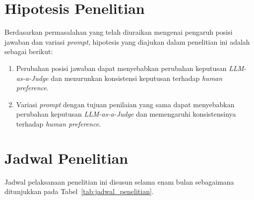 \section{Hipotesis Penelitian}

Berdasarkan permasalahan yang telah diuraikan mengenai pengaruh posisi jawaban dan variasi \textit{prompt}, hipotesis yang diajukan dalam penelitian ini adalah sebagai berikut:
\begin{enumerate}
  \item Perubahan posisi jawaban dapat menyebabkan perubahan keputusan \textit{LLM-as-a-Judge} dan menurunkan konsistensi keputusan terhadap \textit{human preference}.
  \item Variasi \textit{prompt} dengan tujuan penilaian yang sama dapat menyebabkan perubahan keputusan \textit{LLM-as-a-Judge} dan memengaruhi konsistensinya terhadap \textit{human preference}.
\end{enumerate}

\section{Jadwal Penelitian}

Jadwal pelaksanaan penelitian ini disusun selama enam bulan sebagaimana ditunjukkan pada Tabel~\ref{tab:jadwal_penelitian}.

